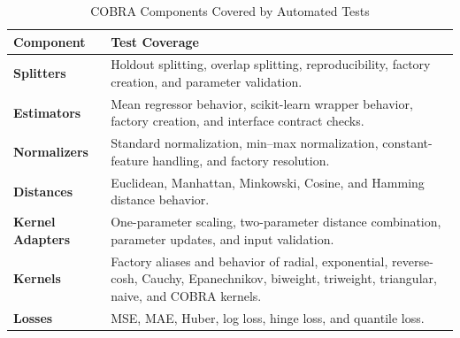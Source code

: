 \begin{table}[H]
      \centering
      \caption{COBRA Components Covered by Automated Tests}
      \label{tab:covered_cobra_test_components}
      \renewcommand{\arraystretch}{1.2}
      \begin{tabularx}{\textwidth}{
                  >{\raggedright\arraybackslash}p{3.2cm}
                  >{\raggedright\arraybackslash}X
            }
            \toprule
            \textbf{Component}        & \textbf{Test Coverage}                                                                                                  \\
            \midrule
            \textbf{Splitters}        &
            Holdout splitting, overlap splitting, reproducibility, factory creation, and parameter validation.                                                  \\

            \textbf{Estimators}       &
            Mean regressor behavior, scikit-learn wrapper behavior, factory creation, and interface contract checks.                                            \\

            \textbf{Normalizers}      &
            Standard normalization, min--max normalization, constant-feature handling, and factory resolution.                                                  \\

            \textbf{Distances}        &
            Euclidean, Manhattan, Minkowski, Cosine, and Hamming distance behavior.                                                                             \\

            \textbf{Kernel Adapters}  &
            One-parameter scaling, two-parameter distance combination, parameter updates, and input validation.                                                 \\

            \textbf{Kernels}          &
            Factory aliases and behavior of radial, exponential, reverse-cosh, Cauchy, Epanechnikov, biweight, triweight, triangular, naive, and COBRA kernels. \\

            \textbf{Losses}           &
            MSE, MAE, Huber, log loss, hinge loss, and quantile loss.                                                                                           \\


\end{tabularx}
\end{table}

